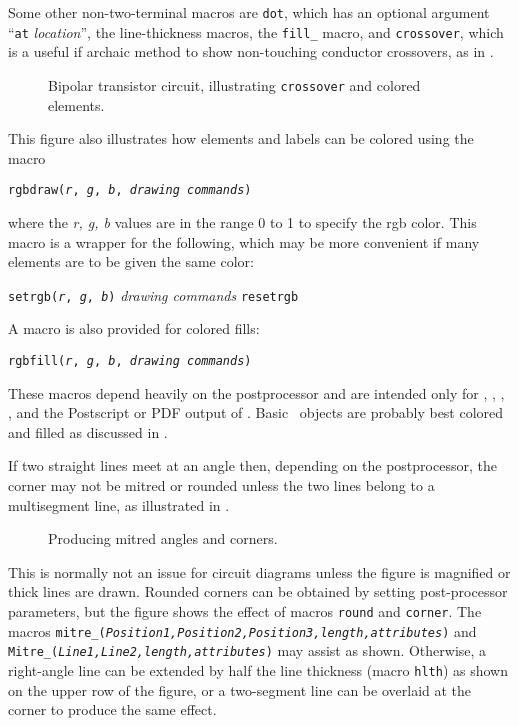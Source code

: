 Some other non-two-terminal macros are {\tt dot}, which has an
optional argument ``{\tt at} {\sl location}'', the line-thickness
macros, the {\tt fill\_} macro, and {\tt crossover}, which is a useful if
archaic method to show non-touching conductor crossovers, as in
.
\begin{figure}[h!t]
   
   \caption{Bipolar transistor circuit, illustrating {\tt crossover}
      and colored elements.}
   \label{bistable}
   \end{figure}

This figure also illustrates how elements and labels can be colored
using the macro
\par
{\tt rgbdraw({\sl r}, {\sl g}, {\sl b}, {\sl drawing commands})}
\par
\noindent
where the {\sl r, g, b} values are in the range 0 to 1
to specify the rgb color.
This macro is a wrapper for the following, which may be more convenient
if many elements are to be given the same color:

   {\tt setrgb({\sl r}, {\sl g}, {\sl b})}
      \hfill\break\hspace*{\parindent}%
   {\sl drawing commands}
      \hfill\break\hspace*{\parindent}%
   {\tt resetrgb}

A macro is also provided for colored fills:

{\tt rgbfill({\sl r}, {\sl g}, {\sl b}, {\sl drawing commands})}

\noindent%
These macros depend heavily on the postprocessor and are intended only for 
\PSTricks, \TPGF, \MetaPost, \SVG, and the Postscript or PDF output of \dpic.
Basic \Pic\ objects are probably best colored and filled as discussed
in .

%
If two straight lines meet at an angle then, depending on the postprocessor,
the corner may not be mitred or rounded unless the two lines belong to
a multisegment line, as illustrated in .
\begin{figure}[ht]
   
   \caption{Producing mitred angles and corners.}
   \label{Corners}
   \end{figure}
This is normally
not an issue for circuit diagrams unless the figure is magnified or thick
lines are drawn.  Rounded corners can be obtained by setting post-processor
parameters, but the figure shows the effect of
macros {\tt round} and {\tt corner}.
The macros
{\tt mitre\_({\sl Position1,Position2,Position3,length,attributes})}
and
{\tt Mitre\_({\sl Line1,Line2,length,attributes})}
may assist as shown.
Otherwise, a right-angle line can be extended
by half the line thickness (macro {\tt hlth}) as shown on the upper row
of the figure,
or a two-segment line can be overlaid at the corner to produce the same effect.

